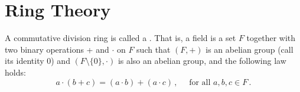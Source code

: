 \chapter{Ring Theory}

\begin{definition}[Field]
	A commutative division ring is called a . That is, a 
	field is a set $F$ together with two binary operations + and 
	$\cdot$ on $F$ such that $(F,+)$ is an abelian group (call its 
	identity 0) and $(F \setminus \{ 0 \}, \cdot)$ is also an 
	abelian group, and the following  law holds:
	\[
		a \cdot (b + c) = (a \cdot b) + (a \cdot c)\,,
		\quad \text{ for all } a,b,c \in F\,.
	\]
\end{definition}